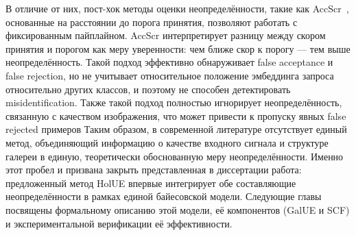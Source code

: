 В отличие от них, пост-хок методы оценки неопределённости, такие как AccScr~\cite{huber2022stating}, основанные на расстоянии до порога принятия, позволяют работать с фиксированным пайплайном.  
AccScr интерпретирует разницу между скором принятия и порогом как меру уверенности: чем ближе скор к порогу — тем выше неопределённость.  
Такой подход эффективно обнаруживает false acceptance и false rejection, но не учитывает относительное положение эмбеддинга запроса относительно других классов, и поэтому не способен детектировать misidentification.  
Также такой подход полностью игнорирует неопределённость, связанную с качеством изображения, что может привести к пропуску явных false rejected примеров
Таким образом, в современной литературе отсутствует единый метод, объединяющий информацию о качестве входного сигнала и структуре галереи в единую, теоретически обоснованную меру неопределённости.  
Именно этот пробел и призвана закрыть представленная в диссертации работа: предложенный метод HolUE впервые интегрирует обе составляющие неопределённости в рамках единой байесовской модели.  
Следующие главы посвящены формальному описанию этой модели, её компонентов (GalUE и SCF) и экспериментальной верификации её эффективности.